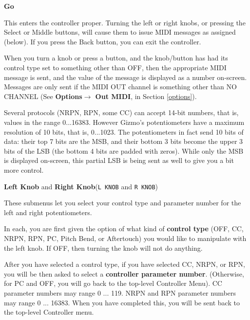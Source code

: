 \documentclass{article}
\begin{document}
	\begin{description}

	\item{\bf Go}
	
	This enters the controller proper.  Turning the left or right knobs, or pressing the Select or Middle buttons, will cause them to issue MIDI messages as assigned (below).  If you press the Back button, you can exit the controller.
	
	When you turn a knob or press a button, and the knob/button has had its control type set to something other than OFF, then the appropriate MIDI message is sent, and the value of the message is displayed as a number on-screen.  Messages are only sent if the MIDI OUT channel is something other than NO CHANNEL (See {\bf Options\(\boldsymbol\rightarrow\) Out MIDI}, in Section \ref{options}).
	
	Several protocols (NRPN, RPN, some CC) can accept 14-bit numbers, that is, values in the range 0...16383.  However Gizmo's potentiometers have a maximum resolution of 10 bits, that is, 0...1023.   The potentiometers in fact send 10 bits of data: their top 7 bits are the MSB, and their bottom 3 bits become the upper 3 bits of the LSB (the bottom 4 bits are padded with zeros).   While only the MSB is displayed on-screen, this partial LSB is being sent as well to give you a bit more control.  %

	\item{\bf Left Knob} and {\bf Right Knob}\quad (\texttt{L KNOB} and \texttt{R KNOB})
	
	These submenus let you select your control type and parameter number for the left and right potentiometers.
	
	In each, you are first given the option of what kind of {\bf control type} (OFF, CC, NRPN, RPN, PC, Pitch Bend, or Aftertouch)%
you would like to manipulate with the left knob.  If OFF, then turning the knob will not do anything.

	After you have selected a control type, if you have selected CC, NRPN, or RPN, you will be then asked to select a {\bf controller parameter number}.  (Otherwise, for PC and OFF, you will go back to the top-level Controller Menu).  CC parameter numbers may range 0 ... 119.  NRPN and RPN parameter numbers may range 0 ... 16383. When you have completed this, you will be sent back to the top-level Controller menu.


\end{description}
\end{document}
